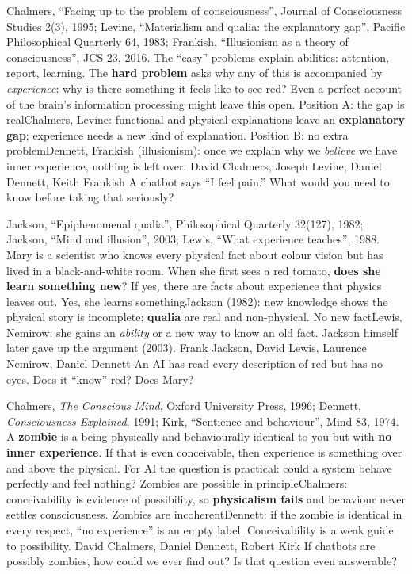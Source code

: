 {Chalmers, ``Facing up to the problem of consciousness'', Journal of Consciousness Studies 2(3), 1995; Levine, ``Materialism and qualia: the explanatory gap'', Pacific Philosophical Quarterly 64, 1983; Frankish, ``Illusionism as a theory of consciousness'', JCS 23, 2016.}
{The ``easy'' problems explain abilities: attention, report, learning. The \textbf{hard problem} asks why any of this is accompanied by \emph{experience}: why is there something it feels like to see red? Even a perfect account of the brain's information processing might leave this open.}
{Position A: the gap is real}{Chalmers, Levine: functional and physical explanations leave an \textbf{explanatory gap}; experience needs a new kind of explanation.}
{Position B: no extra problem}{Dennett, Frankish (illusionism): once we explain why we \emph{believe} we have inner experience, nothing is left over.}
{David Chalmers, Joseph Levine, Daniel Dennett, Keith Frankish}
{A chatbot says ``I feel pain.'' What would you need to know before taking that seriously?}

{Jackson, ``Epiphenomenal qualia'', Philosophical Quarterly 32(127), 1982; Jackson, ``Mind and illusion'', 2003; Lewis, ``What experience teaches'', 1988.}
{Mary is a scientist who knows every physical fact about colour vision but has lived in a black-and-white room. When she first sees a red tomato, \textbf{does she learn something new}? If yes, there are facts about experience that physics leaves out.}
{Yes, she learns something}{Jackson (1982): new knowledge shows the physical story is incomplete; \textbf{qualia} are real and non-physical.}
{No new fact}{Lewis, Nemirow: she gains an \emph{ability} or a new way to know an old fact. Jackson himself later gave up the argument (2003).}
{Frank Jackson, David Lewis, Laurence Nemirow, Daniel Dennett}
{An AI has read every description of red but has no eyes. Does it ``know'' red? Does Mary?}

{Chalmers, \emph{The Conscious Mind}, Oxford University Press, 1996; Dennett, \emph{Consciousness Explained}, 1991; Kirk, ``Sentience and behaviour'', Mind 83, 1974.}
{A \textbf{zombie} is a being physically and behaviourally identical to you but with \textbf{no inner experience}. If that is even conceivable, then experience is something over and above the physical. For AI the question is practical: could a system behave perfectly and feel nothing?}
{Zombies are possible in principle}{Chalmers: conceivability is evidence of possibility, so \textbf{physicalism fails} and behaviour never settles consciousness.}
{Zombies are incoherent}{Dennett: if the zombie is identical in every respect, ``no experience'' is an empty label. Conceivability is a weak guide to possibility.}
{David Chalmers, Daniel Dennett, Robert Kirk}
{If chatbots are possibly zombies, how could we ever find out? Is that question even answerable?}

